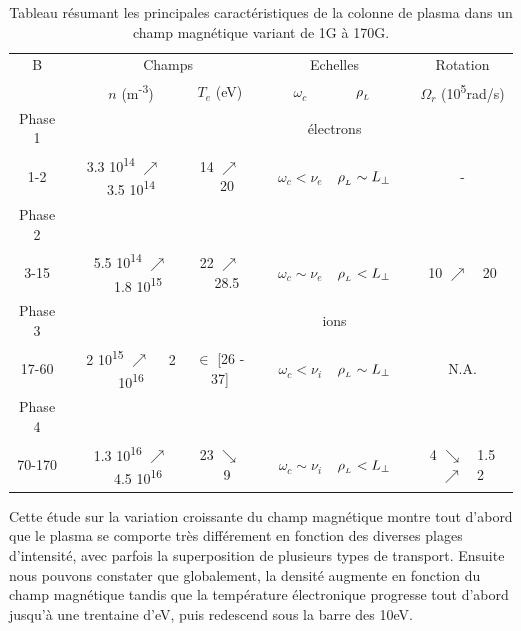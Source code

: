 \begin{refsection}
\begin{table}
\footnotesize\centering
{}
\begin{tabular}{@{}ccccccccc@{}}\toprule
B&&\multicolumn{2}{c}{Champs}&&\multicolumn{2}{c}{Echelles} &&
Rotation\\
\cmidrule{3-4} \cmidrule{6-7} \cmidrule{9-9}
&& $n$ (m\textsuperscript{-3}) & $T_e$ (eV)&& $\omega_c$ &$\rho_{_{L}}$&& $\Omega_r$ (10\textsuperscript{5}rad/s)\\
\midrule Phase 1&&&&&\multicolumn{2}{c}{électrons}\\
\scriptsize 1-2 &&\scriptsize 3.3 10\textsuperscript{14} $\nearrow$~~
\scriptsize 3.5 10\textsuperscript{14} &\scriptsize14 $\nearrow$~~\scriptsize 20 &&
$\omega_c<\nu_e$ &\scriptsize$\rho_{_{L}}\sim L_\perp$ && \scriptsize -
\\
Phase 2\\
\scriptsize 3-15 &&\scriptsize 5.5 10\textsuperscript{14}
$\nearrow$~~\scriptsize 1.8 10\textsuperscript{15} &\scriptsize22
$\nearrow$~~\scriptsize 28.5 && $\omega_c\sim\nu_e$ &\scriptsize$\rho_{_{L}}<
L_\perp$ && \scriptsize 10 $\nearrow$~~\scriptsize20
\\
Phase 3 &&&&&\multicolumn{2}{c}{ions}\\
\scriptsize 17-60 &&\scriptsize 2 10\textsuperscript{15} $\nearrow$~~\scriptsize
2 10\textsuperscript{16} &\scriptsize$\in$ \scriptsize [26 - \scriptsize 37]
&& $\omega_c<\nu_i$ &\scriptsize$\rho_{_{L}}\sim L_\perp$ && \scriptsize N.A.
\\
Phase 4 \\
\scriptsize 70-170 &&\scriptsize 1.3 10\textsuperscript{16}
$\nearrow$~~\scriptsize 4.5 10\textsuperscript{16} &\scriptsize23
$\searrow$~~\scriptsize 9 && $\omega_c\sim\nu_i$ &\scriptsize$\rho_{_{L}}<
L_\perp$ && \scriptsize 4 $\searrow$~~\scriptsize1.5$\nearrow$~~\scriptsize2
\\
\bottomrule
\end{tabular}
\caption{Tableau résumant les principales
caractéristiques de la colonne de plasma dans un champ
magnétique variant de 1G à 170G.}\label{4-CybeleVarMagTab}
\end{table}

Cette étude sur la variation croissante du champ magnétique montre tout d'abord
que le plasma se comporte très différement en fonction des diverses plages
d'intensité, avec parfois la superposition de plusieurs types de transport.
Ensuite nous pouvons constater que globalement, la densité augmente en fonction
du champ magnétique tandis que la température électronique progresse tout
d'abord jusqu'à une trentaine d'eV, puis redescend sous la barre des 10eV. 


\end{refsection}
